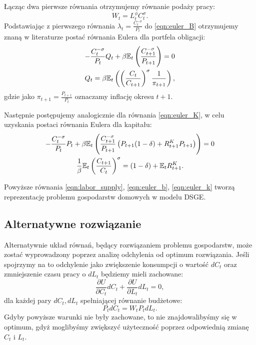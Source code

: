 Łącząc dwa pierwsze równania otrzymujemy równanie podaży pracy:
\begin{equation}
    W_t = L_t^{\phi} C_t^{\sigma} \label{eqn:labor_supply}.
\end{equation}
Podstawiając z pierwszego równania $\lambda_t = \frac{C_t^{-\sigma}}{P_t}$ do \eqref{eqn:euler_B} otrzymujemy znaną w literaturze postać równania Eulera dla portfela obligacji:
\begin{gather}
    -\frac{C_t^{-\sigma}}{P_t} Q_t + \beta \mathbb{E}_t \left( \frac{C_{t+1}^{-\sigma}}{P_{t+1}}\right) = 0 \\
    Q_t = \beta \mathbb{E}_t \left( \left(\frac{C_t}{C_{t+1}}\right)^\sigma \frac{1}{\pi_{t+1}}\right) \label{eqn:euler_b},
\end{gather}
gdzie jako $\pi_{t+1} = \frac{P_{t+1}}{P_t}$ oznaczamy inflację okresu $t+1$.

Następnie postępujemy analogicznie dla równania \eqref{eqn:euler_K}, w celu uzyskania postaci równania Eulera dla kapitału:
\begin{gather}
    -\frac{C_t^{-\sigma}}{P_t} P_t + \beta \mathbb{E}_t \left( \frac{C_{t+1}^{-\sigma}}{P_{t+1}} \left(P_{t+1}(1-\delta) + R^K_{t+1} P_{t+1}\right)\right) = 0 \\
    \frac{1}{\beta}\mathbb{E}_t\left(\frac{C_{t+1}}{C_t}\right)^\sigma = (1-\delta) + \mathbb{E}_t R^K_{t+1} \label{eqn:euler_k}.
\end{gather}

Powyższe równania \eqref{eqn:labor_supply}, \eqref{eqn:euler_b}, \eqref{eqn:euler_k} tworzą reprezentację problemu gospodarstw domowych w modelu DSGE.

\subsection{Alternatywne rozwiązanie}

Alternatywnie układ równań, będący rozwiązaniem problemu gospodarstw, może zostać wyprowadzony poprzez analizę odchylenia od optimum rozwiązania. Jeśli spojrzymy na to odchylenie jako zwiększenie konsumpcji o wartość $dC_t$ oraz zmniejszenie czasu pracy o $dL_t$ będziemy mieli zachowane:
\begin{equation}
    \frac{\partial U}{\partial C_t} dC_t + \frac{\partial U}{\partial L_t} dL_t = 0,
\end{equation}
dla każdej pary $dC_t, dL_t$ spełniającej równanie budżetowe:
\begin{equation}
    P_t dC_t = W_t P_t dL_t.
\end{equation}
Gdyby powyższe warunki nie były zachowane, to nie znajdowalibyśmy się w optimum, gdyż moglibyśmy zwiększyć użyteczność poprzez odpowiednią zmianę $C_t$ i $L_t$. 

